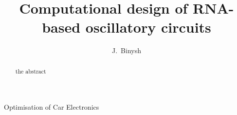 \documentclass[10pt,journal]{./IEEE_latex_class/IEEEtran}
\begin{document}
%
\title{Computational design of RNA-based oscillatory circuits}

\author{J.~Binysh
        \\ 
        \vspace{-3em}}

%
{Optimisation of Car Electronics}

\maketitle

\thispagestyle{empty}

\newcommand{\MYheader}{\smash{\scriptsize

\hfil\parbox[t][\height][t]{\textwidth}{\centering {\normalsize
Place conference title here}}\hfil\hbox{}}}
\makeatletter

\if@twoside
  \def\ps@headings{%
      \let\@oddfoot\@empty\let\@evenfoot\@empty
      \def\@evenhead{\small\thepage\hfil\leftmark\strut\vadjust{\vskip .1ex\hrule}}%
      \def\@oddhead{\small\rightmark\hfil\thepage\strut\vadjust{\vskip .1ex\hrule}}%
      \let\@mkboth\markboth
    \def\chaptermark##1{%
      \markboth{\scshape%
        \ifnum \c@secnumdepth >\m@ne
            \@chapapp\ \thechapter. \ %
        \fi
        ##1}{}}%
    \def\sectionmark##1{%
      \markright{\scshape%
        \ifnum \c@secnumdepth >\z@
          \thesection. \ %
        \fi
        ##1}}}
\else
  \def\ps@headings{%
    \let\@oddfoot\@empty
    \def\@oddhead{{\slshape\rightmark}\hfil\thepage\ of\ \pageref{LastPage} \strut\vadjust{\vskip .1ex\hrule}}%
    \let\@mkboth\markboth
    \def\chaptermark##1{%
      \markright{\scshape%
        \ifnum \c@secnumdepth >\m@ne
            \@chapapp\ \thechapter. \ %
        \fi
        ##1}}}
\fi
\makeatother

\makeatother

\pagestyle{headings}

\begin{abstract}
the abstract
\end{abstract}
\end{document}
